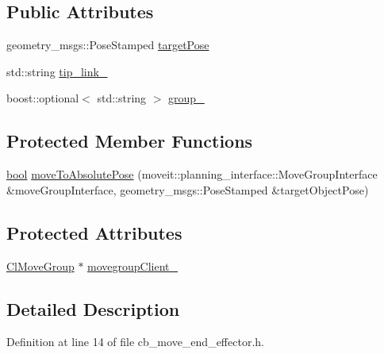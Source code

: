 \subsection*{Public Attributes}
\begin{DoxyCompactItemize}
\item 
geometry\+\_\+msgs\+::\+Pose\+Stamped \hyperlink{classcl__move__group__interface_1_1CbMoveEndEffector_ab0d0c060e52c6f09a6af727e6e954064}{target\+Pose}
\item 
std\+::string \hyperlink{classcl__move__group__interface_1_1CbMoveEndEffector_a4b6f4468b2db565a07119ac90c067436}{tip\+\_\+link\+\_\+}
\item 
boost\+::optional$<$ std\+::string $>$ \hyperlink{classcl__move__group__interface_1_1CbMoveEndEffector_a3060dbea1460d4d55ca73b95f4d17575}{group\+\_\+}
\end{DoxyCompactItemize}
\subsection*{Protected Member Functions}
\begin{DoxyCompactItemize}
\item 
\hyperlink{classbool}{bool} \hyperlink{classcl__move__group__interface_1_1CbMoveEndEffector_a533ec599a0e248f3cb024e9cdf148db2}{move\+To\+Absolute\+Pose} (moveit\+::planning\+\_\+interface\+::\+Move\+Group\+Interface \&move\+Group\+Interface, geometry\+\_\+msgs\+::\+Pose\+Stamped \&target\+Object\+Pose)
\end{DoxyCompactItemize}
\subsection*{Protected Attributes}
\begin{DoxyCompactItemize}
\item 
\hyperlink{classcl__move__group__interface_1_1ClMoveGroup}{Cl\+Move\+Group} $\ast$ \hyperlink{classcl__move__group__interface_1_1CbMoveEndEffector_a86583cb37788b461fc8bb38102a8c0ed}{movegroup\+Client\+\_\+}
\end{DoxyCompactItemize}


\subsection{Detailed Description}


Definition at line 14 of file cb\+\_\+move\+\_\+end\+\_\+effector.\+h.



